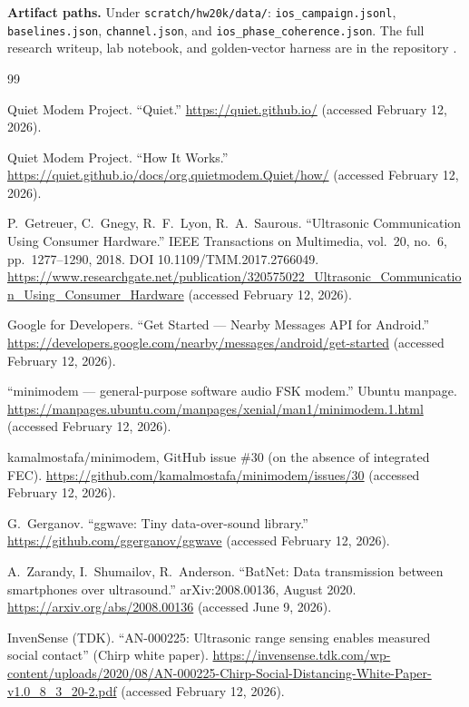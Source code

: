\documentclass[11pt]{article}
\begin{document}
{\sloppy
\textbf{Artifact paths.} Under \texttt{scratch/hw20k/data/}:
\texttt{ios\_campaign.jsonl}, \texttt{baselines.json}, \texttt{channel.json},
and \texttt{ios\_phase\_coherence.json}. The full research writeup, lab notebook,
and golden-vector harness are in the repository \cite{repo}.\par}

\begin{thebibliography}{99}
\small

Quiet Modem Project. ``Quiet.'' \url{https://quiet.github.io/}
(accessed February 12, 2026).

Quiet Modem Project. ``How It Works.''
\url{https://quiet.github.io/docs/org.quietmodem.Quiet/how/}
(accessed February 12, 2026).

P.~Getreuer, C.~Gnegy, R.~F.~Lyon, R.~A.~Saurous. ``Ultrasonic Communication
Using Consumer Hardware.'' IEEE Transactions on Multimedia, vol.~20, no.~6,
pp.~1277--1290, 2018. DOI 10.1109/TMM.2017.2766049.
\url{https://www.researchgate.net/publication/320575022_Ultrasonic_Communication_Using_Consumer_Hardware}
(accessed February 12, 2026).

Google for Developers. ``Get Started --- Nearby Messages API for Android.''
\url{https://developers.google.com/nearby/messages/android/get-started}
(accessed February 12, 2026).

``minimodem --- general-purpose software audio FSK modem.'' Ubuntu manpage.
\url{https://manpages.ubuntu.com/manpages/xenial/man1/minimodem.1.html}
(accessed February 12, 2026).

kamalmostafa/minimodem, GitHub issue \#30 (on the absence of integrated FEC).
\url{https://github.com/kamalmostafa/minimodem/issues/30}
(accessed February 12, 2026).

G.~Gerganov. ``ggwave: Tiny data-over-sound library.''
\url{https://github.com/ggerganov/ggwave} (accessed February 12, 2026).

A.~Zarandy, I.~Shumailov, R.~Anderson. ``BatNet: Data transmission between
smartphones over ultrasound.'' arXiv:2008.00136, August 2020.
\url{https://arxiv.org/abs/2008.00136} (accessed June 9, 2026).

InvenSense (TDK). ``AN-000225: Ultrasonic range sensing enables measured
social contact'' (Chirp white paper).
\url{https://invensense.tdk.com/wp-content/uploads/2020/08/AN-000225-Chirp-Social-Distancing-White-Paper-v1.0_8_3_20-2.pdf}
(accessed February 12, 2026).


\end{thebibliography}
\end{document}
